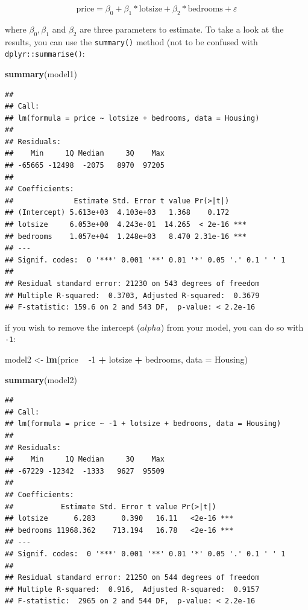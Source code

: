 \documentclass[]{gitbook}
\newenvironment{Shaded}{\begin{snugshade}}{\end{snugshade}}
\newcommand{\DataTypeTok}[1]{\textcolor[rgb]{0.13,0.29,0.53}{#1}}
\newcommand{\DecValTok}[1]{\textcolor[rgb]{0.00,0.00,0.81}{#1}}
\newcommand{\KeywordTok}[1]{\textcolor[rgb]{0.13,0.29,0.53}{\textbf{#1}}}
\newcommand{\NormalTok}[1]{#1}
\newcommand{\OperatorTok}[1]{\textcolor[rgb]{0.81,0.36,0.00}{\textbf{#1}}}
\newcommand{\StringTok}[1]{\textcolor[rgb]{0.31,0.60,0.02}{#1}}
\theoremstyle{definition}
\theoremstyle{definition}
\theoremstyle{definition}
\theoremstyle{remark}
\begin{document}
\[
\text{price} = \beta_0 + \beta_1 * \text{lotsize} + \beta_2 * \text{bedrooms} + \varepsilon
\]

where \(\beta_0, \beta_1\) and \(\beta_2\) are three parameters to
estimate. To take a look at the results, you can use the
\texttt{summary()} method (not to be confused with
\texttt{dplyr::summarise()}:

\begin{Shaded}
\begin{Highlighting}[]
\KeywordTok{summary}\NormalTok{(model1)}
\end{Highlighting}
\end{Shaded}

\begin{verbatim}
## 
## Call:
## lm(formula = price ~ lotsize + bedrooms, data = Housing)
## 
## Residuals:
##    Min     1Q Median     3Q    Max 
## -65665 -12498  -2075   8970  97205 
## 
## Coefficients:
##              Estimate Std. Error t value Pr(>|t|)    
## (Intercept) 5.613e+03  4.103e+03   1.368    0.172    
## lotsize     6.053e+00  4.243e-01  14.265  < 2e-16 ***
## bedrooms    1.057e+04  1.248e+03   8.470 2.31e-16 ***
## ---
## Signif. codes:  0 '***' 0.001 '**' 0.01 '*' 0.05 '.' 0.1 ' ' 1
## 
## Residual standard error: 21230 on 543 degrees of freedom
## Multiple R-squared:  0.3703, Adjusted R-squared:  0.3679 
## F-statistic: 159.6 on 2 and 543 DF,  p-value: < 2.2e-16
\end{verbatim}

if you wish to remove the intercept (\(alpha\)) from your model, you can
do so with \texttt{-1}:

\begin{Shaded}
\begin{Highlighting}[]
\NormalTok{model2 <-}\StringTok{ }\KeywordTok{lm}\NormalTok{(price }\OperatorTok{~}\StringTok{ }\DecValTok{-1} \OperatorTok{+}\StringTok{ }\NormalTok{lotsize }\OperatorTok{+}\StringTok{ }\NormalTok{bedrooms, }\DataTypeTok{data =}\NormalTok{ Housing)}

\KeywordTok{summary}\NormalTok{(model2)}
\end{Highlighting}
\end{Shaded}

\begin{verbatim}
## 
## Call:
## lm(formula = price ~ -1 + lotsize + bedrooms, data = Housing)
## 
## Residuals:
##    Min     1Q Median     3Q    Max 
## -67229 -12342  -1333   9627  95509 
## 
## Coefficients:
##           Estimate Std. Error t value Pr(>|t|)    
## lotsize      6.283      0.390   16.11   <2e-16 ***
## bedrooms 11968.362    713.194   16.78   <2e-16 ***
## ---
## Signif. codes:  0 '***' 0.001 '**' 0.01 '*' 0.05 '.' 0.1 ' ' 1
## 
## Residual standard error: 21250 on 544 degrees of freedom
## Multiple R-squared:  0.916,  Adjusted R-squared:  0.9157 
## F-statistic:  2965 on 2 and 544 DF,  p-value: < 2.2e-16
\end{verbatim}
\end{document}
